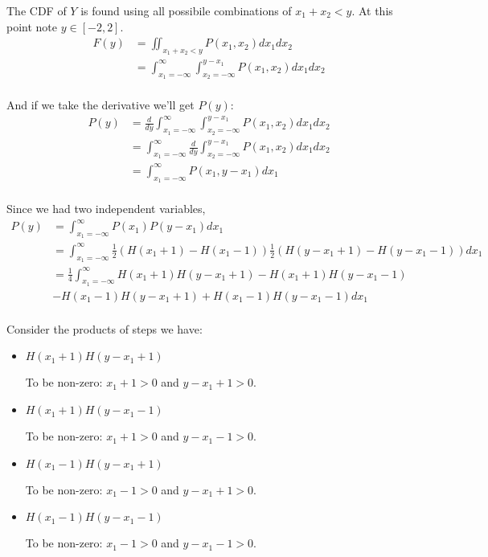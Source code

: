 The CDF of $Y$ is found using all possibile combinations of $x_1 + x_2 < y$. At this point note $y \in [-2, 2]$.
\begin{align*}
    F(y) &= \iint_{x_1 + x_2 < y} P(x_1, x_2) dx_1 dx_2 \\
    &= \int_{x_1 =-\infty}^{\infty} \int_{x_2=-\infty}^{y-x_1} P(x_1, x_2) dx_1 dx_2 \\
\end{align*}

And if we take the derivative we'll get $P(y)$:
\begin{align*}
    P(y) &= \frac{d}{dy} \int_{x_1 =-\infty}^{\infty} \int_{x_2=-\infty}^{y-x_1} P(x_1, x_2) dx_1 dx_2 \\
    &= \int_{x_1 =-\infty}^{\infty} \frac{d}{dy} \int_{x_2=-\infty}^{y-x_1} P(x_1, x_2) dx_1 dx_2 \\
    &= \int_{x_1 =-\infty}^{\infty} P(x_1, y-x_1) dx_1 \\
\end{align*}

Since we had two independent variables,
\begin{align*}
    P(y) &= \int_{x_1 =-\infty}^{\infty} P(x_1)P(y-x_1) dx_1 \\
    &= \int_{x_1 =-\infty}^{\infty} \frac{1}{2}(H(x_1+1) - H(x_1-1))\frac{1}{2}(H(y-x_1+1) - H(y-x_1-1)) dx_1 \\
    &= \frac{1}{4}\int_{x_1 =-\infty}^{\infty} H(x_1+1)H(y-x_1+1) - H(x_1+1)H(y-x_1-1) \\
    &- H(x_1-1)H(y-x_1+1) + H(x_1-1)H(y-x_1-1) dx_1 \\
\end{align*}

Consider the products of steps we have:

\begin{itemize}
    \item $H(x_1+1)H(y-x_1+1)$

    To be non-zero: $x_1 + 1 > 0$ and $y - x_1 + 1 > 0$.

    \item $H(x_1+1)H(y-x_1-1)$

    To be non-zero: $x_1 + 1 > 0$ and $y - x_1 - 1 > 0$.

    \item $H(x_1-1)H(y-x_1+1)$

    To be non-zero: $x_1 - 1 > 0$ and $y - x_1 + 1 > 0$.

    \item $H(x_1-1)H(y-x_1-1)$

    To be non-zero: $x_1 - 1 > 0$ and $y - x_1 - 1 > 0$.

\end{itemize}

